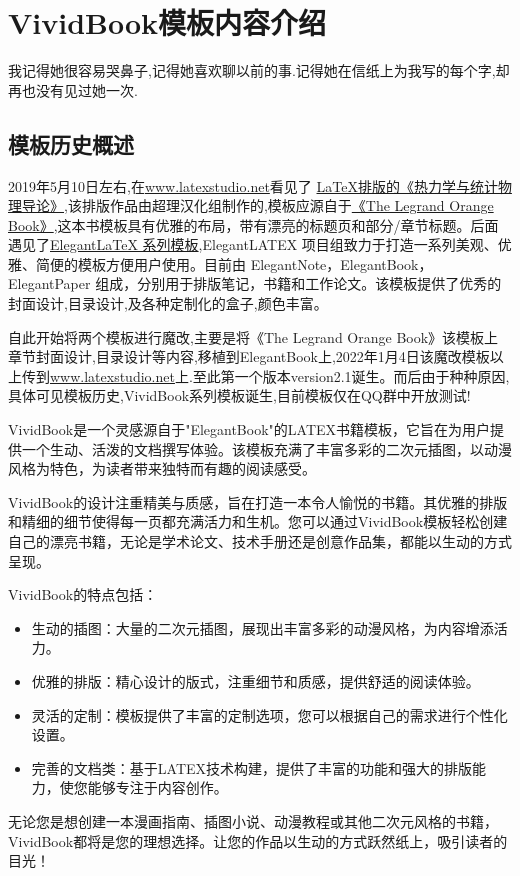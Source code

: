\chapter{VividBook模板内容介绍}
\begin{center}
    \textcolor[RGB]{255, 0, 0}{\faHeart}我记得她很容易哭鼻子,记得她喜欢聊以前的事.记得她在信纸上为我写的每个字,却再也没有见过她一次.\textcolor[RGB]{255, 0, 0}{\faHeart}
\end{center}
\vspace{-5pt}
\begin{center}
\end{center}
\section{模板历史概述}
2019年5月10日左右,在\href{latexstudio论坛}{www.latexstudio.net}看见了
\href{https://www.latexstudio.net/archives/10715.html}{LaTeX排版的《热力学与统计物理导论》},该排版作品由超理汉化组制作的,模板应源自于\href{http://www.latextemplates.com/template/the-legrand-orange-book}{《The Legrand Orange Book》},这本书模板具有优雅的布局，带有漂亮的标题页和部分/章节标题。后面遇见了\href{https://elegantlatex.org/}{Elegant\LaTeX{} 系列模板},ElegantLATEX 项目组致力于打造一系列美观、优雅、简便的模板方便用户使用。目前由
ElegantNote，ElegantBook，ElegantPaper 组成，分别用于排版笔记，书籍和工作论文。该模板提供了优秀的封面设计,目录设计,及各种定制化的盒子,颜色丰富。

自此开始将两个模板进行魔改,主要是将《The Legrand Orange Book》该模板上章节封面设计,目录设计等内容,移植到ElegantBook上,2022年1月4日该魔改模板以上传到\href{latexstudio论坛}{www.latexstudio.net}上.至此第一个版本version2.1诞生。而后由于种种原因,具体可见模板历史,VividBook系列模板诞生,目前模板仅在QQ群中开放测试!

VividBook是一个灵感源自于"ElegantBook"的LATEX书籍模板，它旨在为用户提供一个生动、活泼的文档撰写体验。该模板充满了丰富多彩的二次元插图，以动漫风格为特色，为读者带来独特而有趣的阅读感受。

VividBook的设计注重精美与质感，旨在打造一本令人愉悦的书籍。其优雅的排版和精细的细节使得每一页都充满活力和生机。您可以通过VividBook模板轻松创建自己的漂亮书籍，无论是学术论文、技术手册还是创意作品集，都能以生动的方式呈现。

VividBook的特点包括：
\begin{itemize}
\item 生动的插图：大量的二次元插图，展现出丰富多彩的动漫风格，为内容增添活力。

\item 优雅的排版：精心设计的版式，注重细节和质感，提供舒适的阅读体验。

\item 灵活的定制：模板提供了丰富的定制选项，您可以根据自己的需求进行个性化设置。

\item 完善的文档类：基于LATEX技术构建，提供了丰富的功能和强大的排版能力，使您能够专注于内容创作。
\end{itemize}
无论您是想创建一本漫画指南、插图小说、动漫教程或其他二次元风格的书籍，VividBook都将是您的理想选择。让您的作品以生动的方式跃然纸上，吸引读者的目光！

